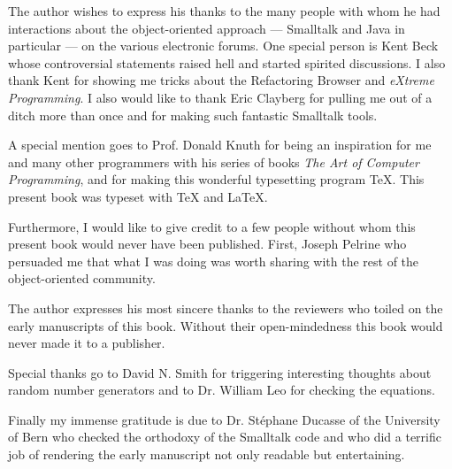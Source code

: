 \documentclass[twoside]{book}
\begin{document}
%
The author wishes to express his
thanks to the many people with whom he had interactions about the
object-oriented approach --- Smalltalk and Java in particular ---
on the various electronic forums. One special person is Kent Beck
whose controversial statements raised hell and started spirited
discussions. I also thank Kent for showing me tricks about the
Refactoring Browser and {\sl eXtreme Programming}. I also would
like to thank Eric Clayberg for pulling me out of a ditch more
than once and for making such fantastic Smalltalk tools.

A special mention goes to Prof. Donald Knuth for being an
inspiration for me and many other programmers with his series of
books {\sl The Art of Computer Programming}, and for making this
wonderful typesetting program \TeX. This present book was typeset
with \TeX{} and \LaTeX.

Furthermore, I would like to give credit to a few people without
whom this present book would never have been published. First,
Joseph Pelrine who persuaded me that what I was doing was worth
sharing with the rest of the object-oriented community.

The author expresses his most sincere thanks to the reviewers who
toiled on the early manuscripts of this book. Without their
open-mindedness this book would never made it to a publisher.

Special thanks go to David N. Smith for triggering interesting
thoughts about random number generators and to Dr. William Leo for
checking the equations.

Finally my immense gratitude is due to Dr. St\'ephane Ducasse of the
University of Bern who checked the orthodoxy of the Smalltalk code
and who did a terrific job of rendering the early manuscript not
only readable but entertaining.

\bigskip
{}


\ifx\wholebook\relax\else
\end{document}

